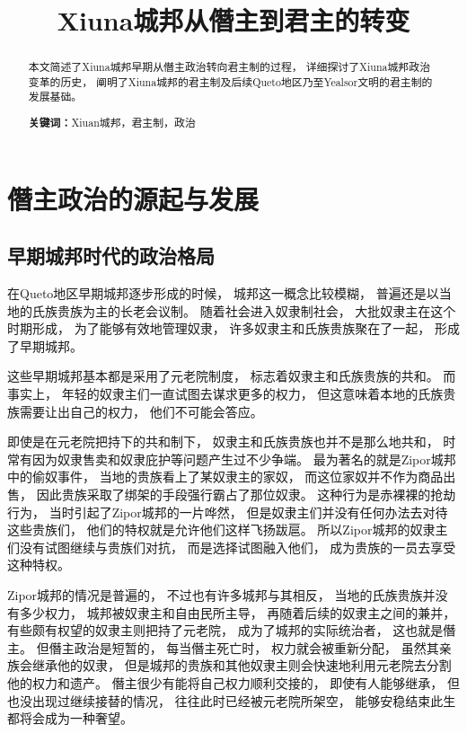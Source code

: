 \documentclass[12pt, a4paper]{ctexart}
\title{Xiuna城邦从僭主到君主的转变}
\author{}
\date{}
\begin{document}
\maketitle
\newpage
\begin{abstract}
    本文简述了Xiuna城邦早期从僭主政治转向君主制的过程，
    详细探讨了Xiuna城邦政治变革的历史，
    阐明了Xiuna城邦的君主制及后续Queto地区乃至Yealsor文明的君主制的发展基础。
    \par\textbf{关键词：}Xiuan城邦，君主制，政治
\end{abstract}

\section{僭主政治的源起与发展}
    \subsection{早期城邦时代的政治格局}
        在Queto地区早期城邦逐步形成的时候，
        城邦这一概念比较模糊，
        普遍还是以当地的氏族贵族为主的长老会议制。
        随着社会进入奴隶制社会，
        大批奴隶主在这个时期形成，
        为了能够有效地管理奴隶，
        许多奴隶主和氏族贵族聚在了一起，
        形成了早期城邦。

        这些早期城邦基本都是采用了元老院制度，
        标志着奴隶主和氏族贵族的共和。
        而事实上，
        年轻的奴隶主们一直试图去谋求更多的权力，
        但这意味着本地的氏族贵族需要让出自己的权力，
        他们不可能会答应。

        即使是在元老院把持下的共和制下，
        奴隶主和氏族贵族也并不是那么地共和，
        时常有因为奴隶售卖和奴隶庇护等问题产生过不少争端。
        最为著名的就是Zipor城邦中的偷奴事件，
        当地的贵族看上了某奴隶主的家奴，
        而这位家奴并不作为商品出售，
        因此贵族采取了绑架的手段强行霸占了那位奴隶。
        这种行为是赤裸裸的抢劫行为，
        当时引起了Zipor城邦的一片哗然，
        但是奴隶主们并没有任何办法去对待这些贵族们，
        他们的特权就是允许他们这样飞扬跋扈。
        所以Zipor城邦的奴隶主们没有试图继续与贵族们对抗，
        而是选择试图融入他们，
        成为贵族的一员去享受这种特权。

        Zipor城邦的情况是普遍的，
        不过也有许多城邦与其相反，
        当地的氏族贵族并没有多少权力，
        城邦被奴隶主和自由民所主导，
        再随着后续的奴隶主之间的兼并，
        有些颇有权望的奴隶主则把持了元老院，
        成为了城邦的实际统治者，
        这也就是僭主。
        但僭主政治是短暂的，
        每当僭主死亡时，
        权力就会被重新分配，
        虽然其亲族会继承他的奴隶，
        但是城邦的贵族和其他奴隶主则会快速地利用元老院去分割他的权力和遗产。
        僭主很少有能将自己权力顺利交接的，
        即使有人能够继承，
        但也没出现过继续接替的情况，
        往往此时已经被元老院所架空，
        能够安稳结束此生都将会成为一种奢望。
\end{document}
